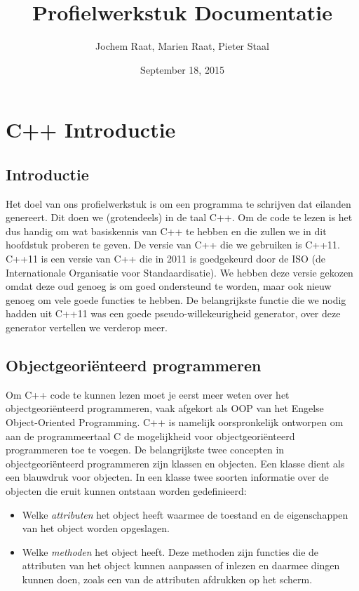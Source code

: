 \documentclass{article}
\title{Profielwerkstuk Documentatie}
\author{Jochem Raat, Marien Raat, Pieter Staal}
\date{September 18, 2015}
\begin{document}
\maketitle
\newpage

\tableofcontents
\newpage

\section{C++ Introductie}

\subsection{Introductie}
Het doel van ons profielwerkstuk is om een programma te schrijven dat eilanden genereert. Dit doen we (grotendeels) in de taal C++. Om de code te lezen is het dus handig om wat basiskennis van C++ te hebben en die zullen we in dit hoofdstuk proberen te geven. De versie van C++ die we gebruiken is C++11. C++11 is een versie van C++ die in 2011 is goedgekeurd door de ISO (de Internationale Organisatie voor Standaardisatie). We hebben deze versie gekozen omdat deze oud genoeg is om goed ondersteund te worden, maar ook nieuw genoeg om vele goede functies te hebben. De belangrijkste functie die we nodig hadden uit C++11 was een goede pseudo-willekeurigheid generator, over deze generator vertellen we verderop meer.

\subsection{Objectgeoriënteerd programmeren}
Om C++ code te kunnen lezen moet je eerst meer weten over het objectgeoriënteerd programmeren, vaak afgekort als OOP van het Engelse Object-Oriented Programming. C++ is namelijk oorspronkelijk ontworpen om aan de programmeertaal C de mogelijkheid voor objectgeoriënteerd programmeren toe te voegen.  De belangrijkste twee concepten in objectgeoriënteerd programmeren zijn klassen en objecten. Een klasse dient als een blauwdruk voor objecten. In een klasse twee soorten informatie over de objecten die eruit kunnen ontstaan worden gedefinieerd:

\begin{itemize}
\item Welke \textit{attributen} het object heeft waarmee de toestand en de eigenschappen van het object worden opgeslagen.
\item Welke \textit{methoden} het object heeft. Deze methoden zijn functies die de attributen van het object kunnen aanpassen of inlezen en daarmee dingen kunnen doen, zoals een van de attributen afdrukken op het scherm.
\end{itemize}
\end{document}
